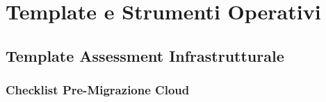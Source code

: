 
\chapter{\texorpdfstring{Template e Strumenti Operativi}{Appendice D - Template e Strumenti Operativi}}
\label{app:template}

\section{\texorpdfstring{Template Assessment Infrastrutturale}{D.1 - Template Assessment Infrastrutturale}}

\subsection{\texorpdfstring{Checklist Pre-Migrazione Cloud}{D.1.1 - Checklist Pre-Migrazione Cloud}}

